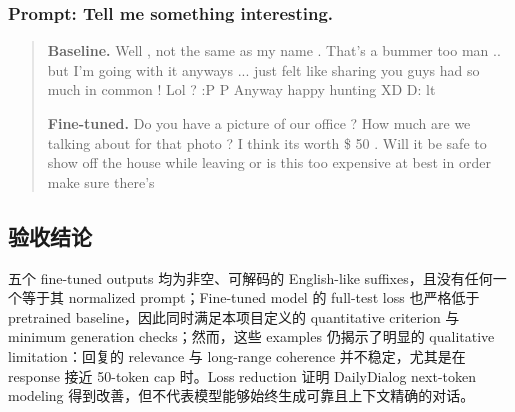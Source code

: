 \documentclass[12pt]{article}
\begin{document}
\subsubsection*{Prompt: Tell me something interesting.}
\begin{quote}\small
\textbf{Baseline.} Well , not the same as my name . That's a bummer too man .. but I'm going with it anyways ... just felt like sharing you guys had so much in common ! Lol ? :P P Anyway happy hunting XD D: lt

\textbf{Fine-tuned.} Do you have a picture of our office ? How much are we talking about for that photo ? I think its worth \$ 50 . Will it be safe to show off the house while leaving or is this too expensive at best in order make sure there's
\end{quote}

\subsection{验收结论}

五个 fine-tuned outputs 均为非空、可解码的 English-like suffixes，且没有任何一个等于其 normalized prompt；Fine-tuned model 的 full-test loss 也严格低于 pretrained baseline，因此同时满足本项目定义的 quantitative criterion 与 minimum generation checks；然而，这些 examples 仍揭示了明显的 qualitative limitation：回复的 relevance 与 long-range coherence 并不稳定，尤其是在 response 接近 50-token cap 时。Loss reduction 证明 DailyDialog next-token modeling 得到改善，但不代表模型能够始终生成可靠且上下文精确的对话。
\end{document}
